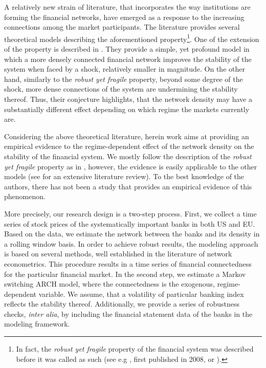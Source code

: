 \documentclass[12pt]{article}
\begin{document}
A relatively new strain of literature, that incorporates the way institutions are forming the financial networks, have emerged as a response to the increasing connections among the market participants. The literature provides several theoretical models describing the aforementioned property\footnote{In fact, the \textit{robust yet fragile} property of the financial system was described before it was called as such (see e.g \cite{gai10}, first published in 2008, or \cite{gallegati08}).}. One of the extension of the property is described in \cite{acemoglu13}. They provide a simple, yet profound model in which a more densely connected financial network improves the stability of the system when faced by a shock, relatively smaller in magnitude. On the other hand, similarly to the \textit{robust yet fragile} property, beyond some degree of the shock, more dense connections of the system are undermining the stability thereof. Thus, their conjecture highlights, that the network density may have a substantially different effect depending on which regime the markets currently are. 

Considering the above theoretical literature, herein work aims at providing an empirical evidence to the regime-dependent effect of the network density on the stability of the financial system. We mostly follow the description of the \textit{robust yet fragile} property as in \cite{acemoglu13}, however, the evidence is easily applicable to the other models (see \cite{glasserman16} for an extensive literature review). To the best knowledge of the authors, there has not been a study that provides an empirical evidence of this phenomenon.

More precisely, our research design is a two-step process. First, we collect a time series of stock prices of the systematically important banks in both US and EU. Based on the data, we estimate the network between the banks and its density in a rolling window basis. In order to achieve robust results, the modeling approach is based on several methods, well established in the literature of network econometrics. This procedure results in a time series of financial connectedness for the particular financial market. In the second step, we estimate a Markov switching ARCH model, where the connectedness is the exogenous, regime-dependent variable. We assume, that a volatility of particular banking index reflects the stability thereof. Additionally, we provide a series of robustness checks, \textit{inter alia}, by including the financial statement data of the banks in the modeling framework.
\end{document}
